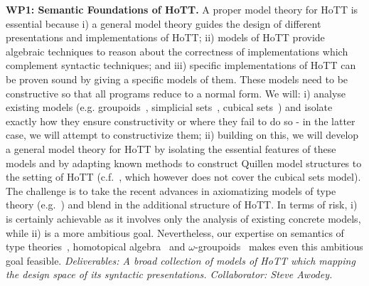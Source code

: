 \documentclass[a4paper,11pt]{article}
\begin{document}
{\bf WP1: Semantic Foundations of HoTT.}  %
A proper model theory for
HoTT is essential because i) a general model theory 
guides the design of different presentations and implementations of
HoTT; ii) models of HoTT provide algebraic techniques to reason
about the correctness of implementations which complement syntactic
techniques; and iii) specific implementations of HoTT can
be proven sound by giving a specific models of them.  These models
need to be constructive so that all programs reduce to a normal form.
We will: i) analyse existing models ({e.g.}
groupoids~\cite{HofmannM:groitt}, simplicial
sets~\cite{KapulkinC:simmuv}, cubical sets~\cite{BezemM:cubsmt}) and
isolate exactly how they ensure constructivity or where they fail to
do so - in the latter case, we will attempt to constructivize them;
ii) building on this, we will develop a general model theory for HoTT
by isolating the essential features of these models and by adapting
known methods to construct Quillen model structures to the setting of
HoTT ({c.f.}~\cite{ShulmanM:uniidh}, which however does not cover the
cubical sets model).  The challenge is to take the recent advances in
axiomatizing models of type theory
({e.g.}~\cite{AwodeyS:natmtt}) and blend in the additional structure of HoTT. In terms
of risk, i) is certainly achievable as it involves only the
analysis of existing concrete models, while ii) is a more ambitious
goal. Nevertheless, our expertise on semantics of type
theories~\cite{neil2014relParamDep}, homotopical
algebra~\cite{GambinoN:homl2c,GambinoN:weilsh} and
$\omega$-groupoids~\cite{alti:csl12} makes even this ambitious goal
feasible. {\em Deliverables: A broad collection of models of HoTT
  which mapping the design space of its syntactic
  presentations. Collaborator: Steve Awodey.}



\end{document}
